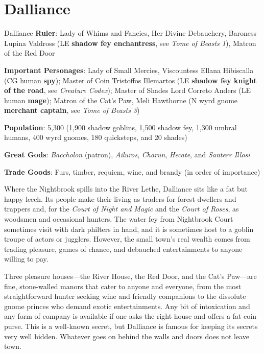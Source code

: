 \documentclass[10pt,a4paper,twoside,bg=print,twocolumn,openany,nodeprecatedcode]{dndbook}
\begin{document}
\section{Dalliance}
\begin{DndSidebar}[float=!b]{Dalliance}
\textbf{Ruler}: Lady of Whims and Fancies, Her Divine Debauchery, Baroness Lupina Valdross (LE \textbf{shadow fey enchantress}, see \textit{Tome of Beasts 1}), Matron of the Red Door



\textbf{Important Personages}: Lady of Small Mercies, Viscountess Ellana Hibiscalla (CG human \textbf{spy}); Master of Coin Tristoffos Illemartos (LE \textbf{shadow fey knight of the road}, see \textit{Creature Codex}); Master of Shades Lord Correto Anders (LE human \textbf{mage}); Matron of the Cat's Paw, Meli Hawthorne (N wyrd gnome \textbf{merchant captain}, see \textit{Tome of Beasts 3})



\textbf{Population}: 5,300 (1,900 shadow goblins, 1,500 shadow fey, 1,300 umbral humans, 400 wyrd gnomes, 180 quicksteps, and 20 shades)



\textbf{Great Gods}: \textit{Baccholon} (patron), \textit{Ailuros}, \textit{Charun}, \textit{Hecate}, and \textit{Santerr Illosi}



\textbf{Trade Goods}: Furs, timber, requiem, wine, and brandy (in order of importance)





\end{DndSidebar}

Where the Nightbrook spills into the River Lethe, Dalliance sits like a fat but happy leech. Its people make their living as traders for forest dwellers and trappers and, for the \textit{Court of Night and Magic} and the \textit{Court of Roses}, as woodsmen and occasional hunters. The water fey from Nightbrook Court sometimes visit with dark philters in hand, and it is sometimes host to a goblin troupe of actors or jugglers. However, the small town's real wealth comes from trading pleasure, games of chance, and debauched entertainments to anyone willing to pay.

Three pleasure houses—the River House, the Red Door, and the Cat's Paw—are fine, stone-walled manors that cater to anyone and everyone, from the most straightforward hunter seeking wine and friendly companions to the dissolute gnome princes who demand exotic entertainments. Any bit of intoxication and any form of company is available if one asks the right house and offers a fat coin purse. This is a well-known secret, but Dalliance is famous for keeping its secrets very well hidden. Whatever goes on behind the walls and doors does not leave town.
\end{document}
